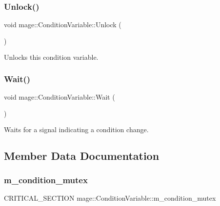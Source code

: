 \subsubsection{\texorpdfstring{Unlock()}{Unlock()}}
{\footnotesize\ttfamily void mage\+::\+Condition\+Variable\+::\+Unlock (\begin{DoxyParamCaption}{ }\end{DoxyParamCaption})\hspace{0.3cm}{\ttfamily [noexcept]}}

Unlocks this condition variable. \hypertarget{classmage_1_1_condition_variable_a15a1d797032d178c787a385d11522efb}{}\label{classmage_1_1_condition_variable_a15a1d797032d178c787a385d11522efb} 
\subsubsection{\texorpdfstring{Wait()}{Wait()}}
{\footnotesize\ttfamily void mage\+::\+Condition\+Variable\+::\+Wait (\begin{DoxyParamCaption}{ }\end{DoxyParamCaption})\hspace{0.3cm}{\ttfamily [noexcept]}}

Waits for a signal indicating a condition change. 

\subsection{Member Data Documentation}
\hypertarget{classmage_1_1_condition_variable_ab5ff870b2881a1979ccaec986d762441}{}\label{classmage_1_1_condition_variable_ab5ff870b2881a1979ccaec986d762441} 
\subsubsection{\texorpdfstring{m\+\_\+condition\+\_\+mutex}{m\_condition\_mutex}}
{\footnotesize\ttfamily C\+R\+I\+T\+I\+C\+A\+L\+\_\+\+S\+E\+C\+T\+I\+ON mage\+::\+Condition\+Variable\+::m\+\_\+condition\+\_\+mutex\hspace{0.3cm}{\ttfamily [private]}}

